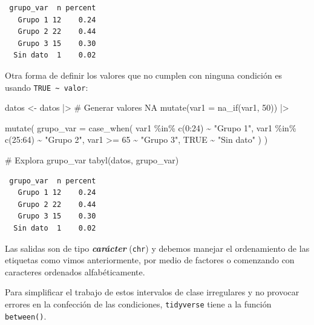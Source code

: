 \documentclass[
  spanish,
  a4paper,
]{scrbook}
\newenvironment{Shaded}{\begin{snugshade}}{\end{snugshade}}
\newcommand{\AttributeTok}[1]{\textcolor[rgb]{0.40,0.45,0.13}{#1}}
\newcommand{\CommentTok}[1]{\textcolor[rgb]{0.37,0.37,0.37}{#1}}
\newcommand{\ConstantTok}[1]{\textcolor[rgb]{0.56,0.35,0.01}{#1}}
\newcommand{\DecValTok}[1]{\textcolor[rgb]{0.68,0.00,0.00}{#1}}
\newcommand{\FunctionTok}[1]{\textcolor[rgb]{0.28,0.35,0.67}{#1}}
\newcommand{\NormalTok}[1]{\textcolor[rgb]{0.00,0.23,0.31}{#1}}
\newcommand{\OtherTok}[1]{\textcolor[rgb]{0.00,0.23,0.31}{#1}}
\newcommand{\SpecialCharTok}[1]{\textcolor[rgb]{0.37,0.37,0.37}{#1}}
\newcommand{\StringTok}[1]{\textcolor[rgb]{0.13,0.47,0.30}{#1}}
\begin{document}
\begin{verbatim}
 grupo_var  n percent
   Grupo 1 12    0.24
   Grupo 2 22    0.44
   Grupo 3 15    0.30
  Sin dato  1    0.02
\end{verbatim}

Otra forma de definir los valores que no cumplen con ninguna condición
es usando \texttt{TRUE\ \textasciitilde{}\ valor}:

\begin{Shaded}
\begin{Highlighting}[]
\NormalTok{datos }\OtherTok{\textless{}{-}}\NormalTok{ datos }\SpecialCharTok{|\textgreater{}}
  \CommentTok{\# Generar valores NA}
  \FunctionTok{mutate}\NormalTok{(}\AttributeTok{var1 =} \FunctionTok{na\_if}\NormalTok{(var1, }\DecValTok{50}\NormalTok{)) }\SpecialCharTok{|\textgreater{}}

  \FunctionTok{mutate}\NormalTok{(}
    \AttributeTok{grupo\_var =} \FunctionTok{case\_when}\NormalTok{(}
\NormalTok{      var1 }\SpecialCharTok{\%in\%} \FunctionTok{c}\NormalTok{(}\DecValTok{0}\SpecialCharTok{:}\DecValTok{24}\NormalTok{) }\SpecialCharTok{\textasciitilde{}} \StringTok{"Grupo 1"}\NormalTok{,}
\NormalTok{      var1 }\SpecialCharTok{\%in\%} \FunctionTok{c}\NormalTok{(}\DecValTok{25}\SpecialCharTok{:}\DecValTok{64}\NormalTok{) }\SpecialCharTok{\textasciitilde{}} \StringTok{"Grupo 2"}\NormalTok{,}
\NormalTok{      var1 }\SpecialCharTok{\textgreater{}=} \DecValTok{65} \SpecialCharTok{\textasciitilde{}} \StringTok{"Grupo 3"}\NormalTok{,}
      \ConstantTok{TRUE} \SpecialCharTok{\textasciitilde{}} \StringTok{"Sin dato"}
\NormalTok{    )}
\NormalTok{  )}

\CommentTok{\# Explora grupo\_var}
\FunctionTok{tabyl}\NormalTok{(datos, grupo\_var)}
\end{Highlighting}
\end{Shaded}

\begin{verbatim}
 grupo_var  n percent
   Grupo 1 12    0.24
   Grupo 2 22    0.44
   Grupo 3 15    0.30
  Sin dato  1    0.02
\end{verbatim}

Las salidas son de tipo \textbf{\emph{carácter}} (\texttt{chr}) y
debemos manejar el ordenamiento de las etiquetas como vimos
anteriormente, por medio de factores o comenzando con caracteres
ordenados alfabéticamente.

Para simplificar el trabajo de estos intervalos de clase irregulares y
no provocar errores en la confección de las condiciones,
\texttt{tidyverse} tiene a la función \texttt{between()}.
\end{document}
